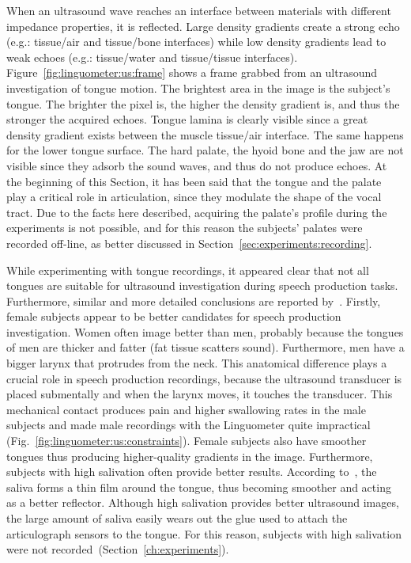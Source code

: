 
When an ultrasound wave reaches an interface between materials with different
impedance properties, it is reflected. Large density gradients create a strong
echo (e.g.: tissue/air and tissue/bone interfaces) while low density gradients
lead to weak echoes (e.g.: tissue/water and tissue/tissue interfaces).
Figure~\ref{fig:linguometer:us:frame} shows a frame grabbed from an ultrasound
investigation of tongue motion.
The brightest area in the image is the subject's tongue. The brighter the
pixel is, the higher the density gradient is, and thus the
stronger the acquired echoes.
Tongue lamina is clearly visible since a great density gradient exists between
the muscle tissue/air interface.
The same happens for the lower tongue surface.
The hard palate, the hyoid bone and the jaw are not visible since they adsorb
the sound waves, and thus do not produce echoes. 
At the beginning of this Section, it has been said that the tongue and the
palate play a critical role in articulation, since they modulate the shape
of the vocal tract.
Due to the facts here described, acquiring the palate's profile during the
experiments is not possible, and for this reason the subjects' palates were
recorded off-line, as better discussed in
Section~\ref{sec:experiments:recording}.

While experimenting with tongue recordings, it appeared clear that not all
tongues are suitable for ultrasound investigation during speech production 
tasks.
Furthermore, similar and more detailed conclusions are reported
by~\citet{stone:2005}.
Firstly, female subjects appear to be better candidates for speech production
investigation. Women often image better than men, probably because the tongues
of men are thicker and fatter (fat tissue scatters sound).
Furthermore, men have a bigger larynx that protrudes from the neck. This
anatomical difference plays a crucial role in speech production recordings,
because the ultrasound transducer is placed submentally and when the larynx
moves, it touches the transducer. 
This mechanical contact produces pain and higher swallowing rates in the
male subjects and made male recordings with the Linguometer quite impractical 
(Fig.~\ref{fig:linguometer:us:constraints}).
Female subjects also have smoother tongues thus producing higher-quality
gradients in the image.
Furthermore, subjects with high salivation often provide better results.
According to~\citet{stone:2005}, the saliva forms a thin film around the tongue,
thus becoming smoother and acting as a better reflector.
Although high salivation provides better ultrasound images, the large amount of
saliva easily wears out the glue used to attach the articulograph sensors to the
tongue. For this reason, subjects with high salivation were not
recorded~(Section~\ref{ch:experiments}).

